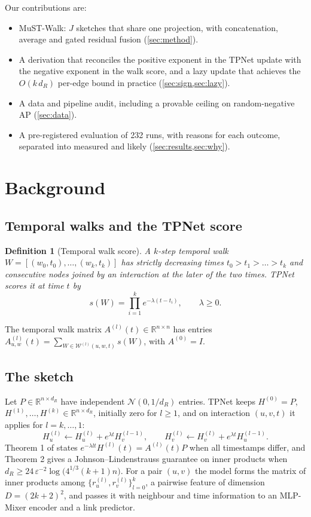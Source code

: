 \documentclass[11pt,a4paper]{article}
\newtheorem{definition}{Definition}
\theoremstyle{remark}
\newcommand{\R}{\mathbb{R}}
\begin{document}
Our contributions are:
\begin{itemize}\itemsep1pt
\item MuST-Walk: $J$ sketches that share one projection, with concatenation, average and gated residual fusion (\cref{sec:method}).
\item A derivation that reconciles the positive exponent in the TPNet update with the negative exponent in the walk score, and a lazy update that achieves the $O(k\,d_R)$ per-edge bound in practice (\cref{sec:sign,sec:lazy}).
\item A data and pipeline audit, including a provable ceiling on random-negative AP (\cref{sec:data}).
\item A pre-registered evaluation of 232 runs, with reasons for each outcome, separated into measured and likely (\cref{sec:results,sec:why}).
\end{itemize}

\section{Background}
\subsection{Temporal walks and the TPNet score}
\begin{definition}[Temporal walk score]
A $k$-step temporal walk $W=[(w_0,t_0),\dots,(w_k,t_k)]$ has strictly decreasing times $t_0>t_1>\dots>t_k$ and consecutive nodes joined by an interaction at the later of the two times. TPNet scores it at time $t$ by
\begin{equation}
s(W)=\prod_{i=1}^{k} e^{-\lambda(t-t_i)},\qquad \lambda\ge 0.
\end{equation}
\end{definition}
The temporal walk matrix $A^{(l)}(t)\in\R^{n\times n}$ has entries $A^{(l)}_{u,w}(t)=\sum_{W\in\mathcal{W}^{(l)}(u,w,t)}s(W)$, with $A^{(0)}=I$.

\subsection{The sketch}
Let $P\in\R^{n\times d_R}$ have independent $\mathcal{N}(0,1/d_R)$ entries. TPNet keeps $H^{(0)}=P$, $H^{(1)},\dots,H^{(k)}\in\R^{n\times d_R}$, initially zero for $l\ge 1$, and on interaction $(u,v,t)$ it applies for $l=k,\dots,1$:
\begin{equation}\label{eq:update}
H_u^{(l)}\leftarrow H_u^{(l)}+e^{\lambda t}H_v^{(l-1)},\qquad H_v^{(l)}\leftarrow H_v^{(l)}+e^{\lambda t}H_u^{(l-1)} .
\end{equation}
Theorem 1 of \cite{tpnet} states $e^{-\lambda l t}H^{(l)}(t)=A^{(l)}(t)P$ when all timestamps differ, and Theorem 2 gives a Johnson--Lindenstrauss guarantee \cite{jl} on inner products when $d_R\ge 24\,\varepsilon^{-2}\log\bigl(4^{1/3}(k+1)n\bigr)$. For a pair $(u,v)$ the model forms the matrix of inner products among $\{r_u^{(l)},r_v^{(l)}\}_{l=0}^{k}$, a pairwise feature of dimension $D=(2k+2)^2$, and passes it with neighbour and time information to an MLP-Mixer encoder and a link predictor.
\end{document}
